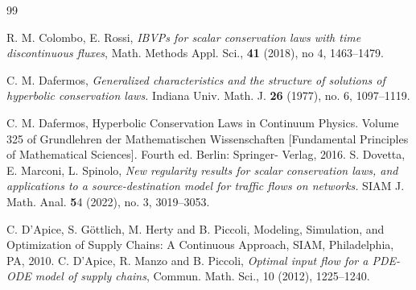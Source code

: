 \documentclass[a4paper, 10pt, final]{article}
\begin{document}
\begin{thebibliography}{99}

 R. M. Colombo, E. Rossi,\textsl{ IBVPs for scalar conservation laws with time discontinuous fluxes}, Math. Methods Appl. Sci., \textbf{41} (2018), no 4, 1463--1479. 



%


 C. M. Dafermos, \textsl{Generalized characteristics and the
    structure of solutions of hyperbolic conservation laws.}  Indiana
  Univ. Math. J. \textbf{26} (1977), no. 6, 1097--1119.
  
   C. M. Dafermos, Hyperbolic Conservation Laws in Continuum Physics. Volume 325 of Grundlehren der Mathematischen
Wissenschaften [Fundamental Principles of Mathematical Sciences]. 
  Fourth ed. Berlin: Springer-
Verlag, 2016.
S. Dovetta, E. Marconi, L. Spinolo,
\textsl{New regularity results for scalar conservation laws, and applications to a source-destination model for traffic flows on networks.}
SIAM J. Math. Anal. {\textbf 54} (2022), no. 3, 3019–3053. 

% 
 C. D'Apice, S. G\"ottlich, M. Herty and B. Piccoli, Modeling, Simulation, and Optimization of Supply Chains: A Continuous Approach, SIAM, Philadelphia, PA, 2010.
%
C. D'Apice, R. Manzo and B. Piccoli, \textsl{Optimal input flow for a PDE-ODE model of supply
chains}, Commun. Math. Sci., 10 (2012), 1225--1240.
%
%
%  
%  


\end{thebibliography}
\end{document}
